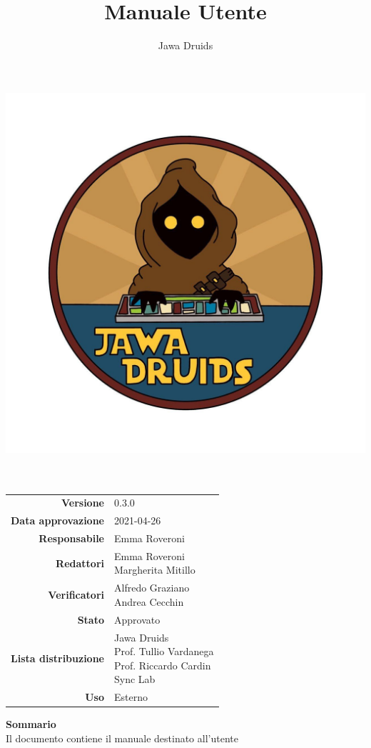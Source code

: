 




	\makeatletter
	\begin{titlepage}
		\begin{center}
			\vspace*{-4cm}
			\author{Jawa Druids}
			\title{Manuale Utente}
			\date{} %
			\includegraphics[width=0.5\linewidth]{../immagini/DRUIDSLOGO.jpg}\\[4ex]
			{\huge \bfseries  \@title }\\[2ex]
			{\LARGE  \@author}\\[50ex]
			\vspace*{-9cm}
			\begin{table}[H]
				\renewcommand{\arraystretch}{1.4}
				\centering
				\begin{tabular}{r | l}
					\textbf{Versione} & 0.3.0 \\%
					\textbf{Data approvazione} & 2021-04-26\\
					\textbf{Responsabile} & Emma Roveroni\\
					\textbf{Redattori} & \makecell[tl]{ Emma Roveroni \\ Margherita Mitillo} \\
					\textbf{Verificatori} & \makecell[tl]{Alfredo Graziano \\ Andrea Cecchin} \\
					\textbf{Stato} & Approvato\\
					\textbf{Lista distribuzione} & \makecell[tl]{Jawa Druids \\ Prof. Tullio Vardanega \\ Prof. Riccardo Cardin \\ Sync Lab}\\
					\textbf{Uso} & Esterno
				\end{tabular}
			\end{table}
			\vspace{0.1cm}
			\hfill \break
			\fontsize{17}{10}\textbf{Sommario} \\
			\vspace{0.1cm}
			Il documento contiene il manuale destinato all'utente
		\end{center}
	\end{titlepage}
	\makeatother

	
	\tableofcontents{}
	\listoffigures

	
	
	
	
	


